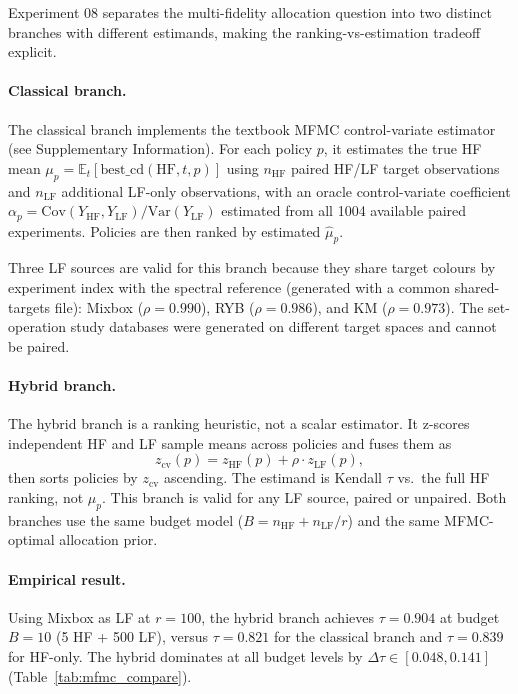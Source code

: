 \documentclass[twoside,twocolumn,9pt]{article}
\begin{document}
Experiment 08 separates the multi-fidelity allocation question into two distinct branches with different estimands, making the ranking-vs-estimation tradeoff explicit.

\paragraph{Classical branch.}
The classical branch implements the textbook MFMC control-variate estimator (see Supplementary Information).  For each policy $p$, it estimates the true HF mean $\mu_p = \mathbb{E}_t[\mathrm{best\_cd}(\mathrm{HF}, t, p)]$ using $n_\mathrm{HF}$ paired HF/LF target observations and $n_\mathrm{LF}$ additional LF-only observations, with an oracle control-variate coefficient $\alpha_p = \mathrm{Cov}(Y_\mathrm{HF}, Y_\mathrm{LF})/\mathrm{Var}(Y_\mathrm{LF})$ estimated from all 1004 available paired experiments.  Policies are then ranked by estimated $\hat{\mu}_p$.

Three LF sources are valid for this branch because they share target colours by experiment index with the spectral reference (generated with a common shared-targets file): Mixbox ($\rho = 0.990$), RYB ($\rho = 0.986$), and KM ($\rho = 0.973$).  The set-operation study databases were generated on different target spaces and cannot be paired.

\paragraph{Hybrid branch.}
The hybrid branch is a ranking heuristic, not a scalar estimator.  It z-scores independent HF and LF sample means across policies and fuses them as
\[
    z_\mathrm{cv}(p) = z_\mathrm{HF}(p) + \rho \cdot z_\mathrm{LF}(p),
\]
then sorts policies by $z_\mathrm{cv}$ ascending.  The estimand is Kendall $\tau$ vs.\ the full HF ranking, not $\mu_p$.  This branch is valid for any LF source, paired or unpaired.  Both branches use the same budget model ($B = n_\mathrm{HF} + n_\mathrm{LF}/r$) and the same MFMC-optimal allocation prior.

\paragraph{Empirical result.}
Using Mixbox as LF at $r = 100$, the hybrid branch achieves $\tau = 0.904$ at budget $B = 10$ (5 HF + 500 LF), versus $\tau = 0.821$ for the classical branch and $\tau = 0.839$ for HF-only.  The hybrid dominates at all budget levels by $\Delta\tau \in [0.048, 0.141]$ (Table~\ref{tab:mfmc_compare}).
\end{document}
